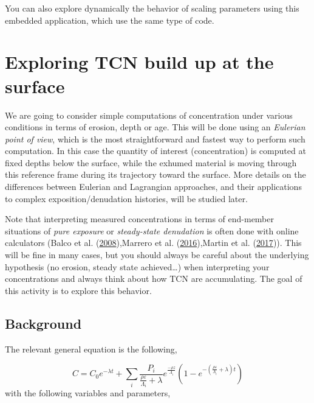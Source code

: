 \documentclass[
]{book}
\begin{document}
You can also explore dynamically the behavior of scaling parameters using this embedded application, which use the same type of code.

\hypertarget{exploring-tcn-build-up-at-the-surface}{%
\chapter{Exploring TCN build up at the surface}\label{exploring-tcn-build-up-at-the-surface}}

We are going to consider simple computations of concentration under various conditions in terms of erosion, depth or age.
This will be done using an \emph{Eulerian point of view}, which is the most straightforward and fastest way to perform such computation.
In this case the quantity of interest (concentration) is computed at fixed depths below the surface, while the exhumed material is moving through this reference frame during its trajectory toward the surface.
More details on the differences between Eulerian and Lagrangian approaches, and their applications to complex exposition/denudation histories, will be studied later.

Note that interpreting measured concentrations in terms of end-member situations of \emph{pure exposure} or \emph{steady-state denudation} is often done with online calculators (Balco et al. (\protect\hyperlink{ref-balco2008complete}{2008}),Marrero et al. (\protect\hyperlink{ref-marrero2016cronusearth}{2016}),Martin et al. (\protect\hyperlink{ref-martin2017crep}{2017})).
This will be fine in many cases, but you should always be careful about the underlying hypothesis (no erosion, steady state achieved\ldots) when interpreting your concentrations and always think about how TCN are accumulating.
The goal of this activity is to explore this behavior.

\hypertarget{background}{%
\section{Background}\label{background}}

The relevant general equation is the following,

\[
C=C_0e^{-\lambda t} + \sum_i \frac{P_i}{\frac{\rho \varepsilon}{\Lambda_i}+\lambda}e^{\frac{-\rho z}{\Lambda_i}}(1-e^{-(\frac{\rho \varepsilon}{\Lambda_i}+\lambda)t})
\] with the following variables and parameters,
\end{document}
